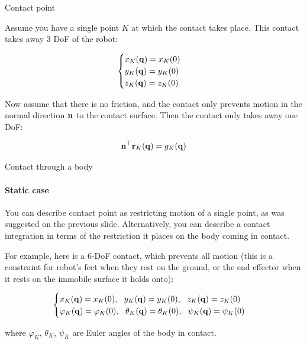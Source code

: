 \documentclass{beamer}
\begin{document}
\begin{frame}{Contact point}
\begin{flushleft}

Assume you have a single point $K$ at which the contact takes place. This contact takes away 3 DoF of the robot:

\begin{equation}
    \begin{cases}
    x_K(\mathbf{q}) = x_K(0) \\
    y_K(\mathbf{q}) = y_K(0) \\
    z_K(\mathbf{q}) = z_K(0)
    \end{cases}
\end{equation}

Now assume that there is no friction, and the contact only prevents motion in the normal direction $\mathbf{n}$ to the contact surface. Then the contact only takes away one DoF:

\begin{equation}
    \mathbf{n}^\top \mathbf{r}_K(\mathbf{q}) = g_K(\mathbf{q})
\end{equation}

\end{flushleft}
\end{frame}




\begin{frame}{Contact through a body}
\framesubtitle{Static case}
\begin{flushleft}

You can describe contact point as restricting motion of a single point, as was suggested on the previous slide. Alternatively, you can describe a contact integration in terms of the restriction it places on the body coming in contact. 

\bigskip

For example, here is a 6-DoF contact, which prevents all motion (this is a constraint for robot's feet when they rest on the ground, or the end effector when it rests on the immobile surface it holds onto):

\begin{equation}
    \begin{cases}
    x_K(\mathbf{q}) = x_K(0), \ \  y_K(\mathbf{q}) = y_K(0),  \ \ z_K(\mathbf{q}) = z_K(0) \\
    \varphi_K(\mathbf{q}) = \varphi_K(0), \ \ \theta_K(\mathbf{q})  = \theta_K(0), \ \ \psi_K(\mathbf{q})    = \psi_K(0)
    \end{cases}
\end{equation}

where $\varphi_K$, $\theta_K$, $\psi_K$ are Euler angles of the body in contact. 

\end{flushleft}
\end{frame}
\end{document}

